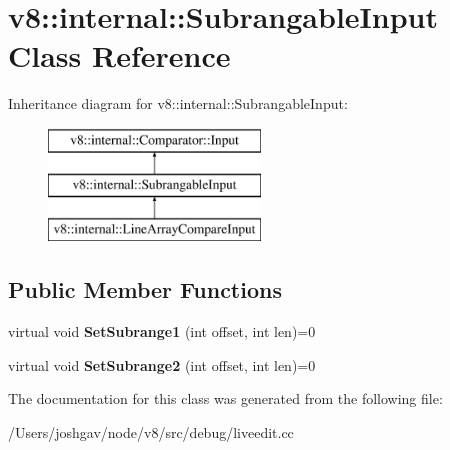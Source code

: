 \hypertarget{classv8_1_1internal_1_1_subrangable_input}{}\section{v8\+:\+:internal\+:\+:Subrangable\+Input Class Reference}
\label{classv8_1_1internal_1_1_subrangable_input}
Inheritance diagram for v8\+:\+:internal\+:\+:Subrangable\+Input\+:\begin{figure}[H]
\begin{center}
\leavevmode
\includegraphics[height=3.000000cm]{classv8_1_1internal_1_1_subrangable_input}
\end{center}
\end{figure}
\subsection*{Public Member Functions}
\begin{DoxyCompactItemize}
\item 
virtual void {\bfseries Set\+Subrange1} (int offset, int len)=0\hypertarget{classv8_1_1internal_1_1_subrangable_input_a9fec3e1dda77ea633776d5b574bb62a2}{}\label{classv8_1_1internal_1_1_subrangable_input_a9fec3e1dda77ea633776d5b574bb62a2}

\item 
virtual void {\bfseries Set\+Subrange2} (int offset, int len)=0\hypertarget{classv8_1_1internal_1_1_subrangable_input_ab092f639fde4aeb74efd697dc7dd18cf}{}\label{classv8_1_1internal_1_1_subrangable_input_ab092f639fde4aeb74efd697dc7dd18cf}

\end{DoxyCompactItemize}


The documentation for this class was generated from the following file\+:\begin{DoxyCompactItemize}
\item 
/\+Users/joshgav/node/v8/src/debug/liveedit.\+cc\end{DoxyCompactItemize}
